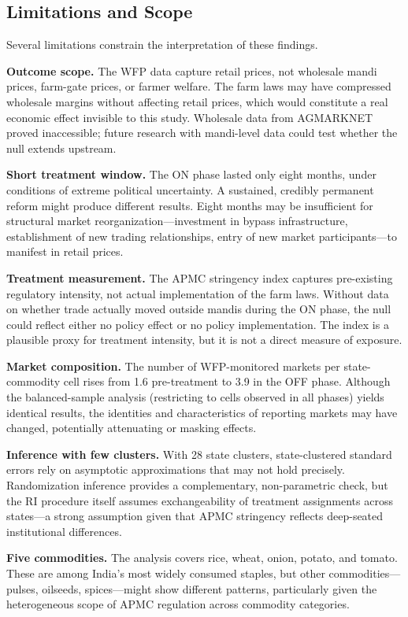\documentclass[12pt]{article}
\begin{document}
\subsection{Limitations and Scope}

Several limitations constrain the interpretation of these findings.

\textbf{Outcome scope.} The WFP data capture retail prices, not wholesale mandi prices, farm-gate prices, or farmer welfare. The farm laws may have compressed wholesale margins without affecting retail prices, which would constitute a real economic effect invisible to this study. Wholesale data from AGMARKNET proved inaccessible; future research with mandi-level data could test whether the null extends upstream.

\textbf{Short treatment window.} The ON phase lasted only eight months, under conditions of extreme political uncertainty. A sustained, credibly permanent reform might produce different results. Eight months may be insufficient for structural market reorganization---investment in bypass infrastructure, establishment of new trading relationships, entry of new market participants---to manifest in retail prices.

\textbf{Treatment measurement.} The APMC stringency index captures pre-existing regulatory intensity, not actual implementation of the farm laws. Without data on whether trade actually moved outside mandis during the ON phase, the null could reflect either no policy effect or no policy implementation. The index is a plausible proxy for treatment intensity, but it is not a direct measure of exposure.

\textbf{Market composition.} The number of WFP-monitored markets per state-commodity cell rises from 1.6 pre-treatment to 3.9 in the OFF phase. Although the balanced-sample analysis (restricting to cells observed in all phases) yields identical results, the identities and characteristics of reporting markets may have changed, potentially attenuating or masking effects.

\textbf{Inference with few clusters.} With 28 state clusters, state-clustered standard errors rely on asymptotic approximations that may not hold precisely. Randomization inference provides a complementary, non-parametric check, but the RI procedure itself assumes exchangeability of treatment assignments across states---a strong assumption given that APMC stringency reflects deep-seated institutional differences.

\textbf{Five commodities.} The analysis covers rice, wheat, onion, potato, and tomato. These are among India's most widely consumed staples, but other commodities---pulses, oilseeds, spices---might show different patterns, particularly given the heterogeneous scope of APMC regulation across commodity categories.
\end{document}
